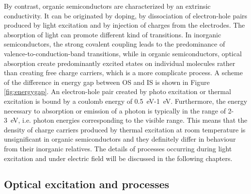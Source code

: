 \documentclass  [
  paper    = a4,
  BCOR     = 10mm,
  twoside,
  fontsize = 12pt,
  fleqn,
  toc      = bibnumbered,
  toc      = listofnumbered,
  numbers  = noendperiod,
  headings = normal,
  listof   = leveldown,
  version  = 3.03
]                                       {scrreprt}
\begin{document}
By contrast, organic semiconductors are characterized by an extrinsic conductivity. It can be originated by doping, by dissociation of electron-hole pairs produced by light excitation and by injection of charges from the electrodes. The absorption of light can promote different kind of transitions. In inorganic semiconductors, the strong covalent coupling leads to the predominance of valence-to-conduction-band transitions, while in organic semiconductors, optical absorption create predominantly excited states on individual molecules rather than creating free charge carriers, which is a more complicate process. A scheme of the difference in energy gap between OS and IS is shown in Figure \ref{fig:energygap}. An electron-hole pair created by photo excitation or thermal excitation is bound by a coulomb energy of \SI{0.5}{\electronvolt}-\SI{1}{\electronvolt}. Furthermore, the energy necessary to absorption or emission of a photon is typically in the range of 2-\SI{3}{\electronvolt}, i.e. photon energies corresponding to the visible range. This means that the density of charge carriers produced by thermal excitation at room temperature is unsignificant in organic semiconductors and they definitely differ in behaviour from their inorganic relatives. The details of processes occurring during light excitation and under electric field will be discussed in the following chapters.\\



	\subsection{Optical excitation and processes}\label{sec:optical}
\end{document}
